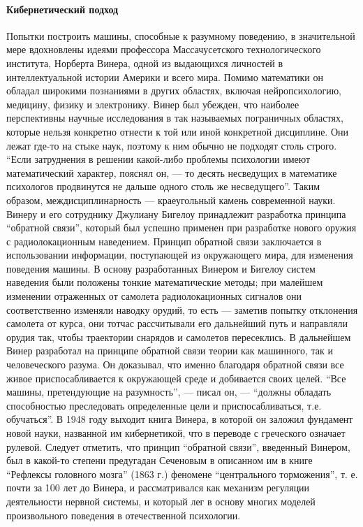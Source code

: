 \paragraph{Кибернетический подход}

Попытки построить машины, способные к разумному поведению, в значительной мере вдохновлены идеями профессора Массачусетского технологического института, Норберта Винера, одной из выдающихся личностей в интеллектуальной истории Америки и всего мира. Помимо математики он обладал широкими познаниями в других областях, включая нейропсихологию, медицину, физику и электронику. Винер был убежден, что наиболее перспективны научные исследования в так называемых пограничных областях, которые нельзя конкретно отнести к той или иной конкретной дисциплине. Они лежат где-то на стыке наук, поэтому к ним обычно не подходят столь строго. ``Если затруднения в решении какой-либо проблемы психологии имеют математический характер, пояснял он, --- то десять несведущих в математике психологов продвинутся не дальше одного столь же несведущего''. Таким образом, междисциплинарность --- краеугольный камень современной науки. Винеру и его сотруднику Джулиану Бигелоу принадлежит разработка принципа ``обратной связи'', который был успешно применен при разработке нового оружия с радиолокационным наведением. Принцип обратной связи заключается в использовании информации, поступающей из окружающего мира, для изменения поведения машины. В основу разработанных Винером и Бигелоу систем наведения были положены тонкие математические методы; при малейшем изменении отраженных от самолета радиолокационных сигналов они соответственно изменяли наводку орудий, то есть --- заметив попытку отклонения самолета от курса, они тотчас рассчитывали его дальнейший путь и направляли орудия так, чтобы траектории снарядов и самолетов пересеклись. В дальнейшем Винер разработал на принципе обратной связи теории как машинного, так и человеческого разума. Он доказывал, что именно благодаря обратной связи все живое приспосабливается к окружающей среде и добивается своих целей. ``Все машины, претендующие на разумность'', --- писал он, --- ``должны обладать способностью преследовать определенные цели и приспосабливаться, т.е. обучаться''. В 1948 году выходит книга Винера, в которой он заложил фундамент новой науки, названной им кибернетикой, что в переводе с греческого означает рулевой. Следует отметить, что принцип ``обратной связи'', введенный Винером, был в какой-то степени предугадан Сеченовым в описанном им в книге ``Рефлексы головного мозга'' (1863 г.) феномене ``центрального торможения'', т. е. почти за 100 лет до Винера, и рассматривался как механизм регуляции деятельности нервной системы, и который лег в основу многих моделей произвольного поведения в отечественной психологии.

